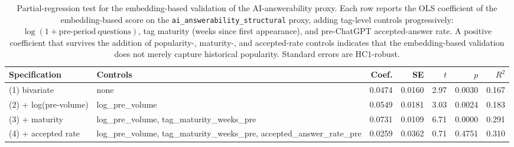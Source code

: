 \begin{table}[ht]
\centering
\caption{Partial-regression test for the embedding-based validation of the AI-answerability proxy. Each row reports the OLS coefficient of the embedding-based score on the \texttt{ai\_answerability\_structural} proxy, adding tag-level controls progressively: $\log(1+\text{pre-period}~\text{questions})$, tag maturity (weeks since first appearance), and pre-ChatGPT accepted-answer rate. A positive coefficient that survives the addition of popularity-, maturity-, and accepted-rate controls indicates that the embedding-based validation does not merely capture historical popularity. Standard errors are $\text{HC1}$-robust.}
\label{tab:embedding_partial_regression}
\small
\begin{tabular}{llrrrrr}
\toprule
Specification & Controls & Coef. & SE & $t$ & $p$ & $R^2$ \\
\midrule
(1) bivariate & none & 0.0474 & 0.0160 & 2.97 & 0.0030 & 0.167 \\
(2) + log(pre-volume) & log_pre_volume & 0.0549 & 0.0181 & 3.03 & 0.0024 & 0.183 \\
(3) + maturity & log_pre_volume, tag_maturity_weeks_pre & 0.0731 & 0.0109 & 6.71 & 0.0000 & 0.291 \\
(4) + accepted rate & log_pre_volume, tag_maturity_weeks_pre, accepted_answer_rate_pre & 0.0259 & 0.0362 & 0.71 & 0.4751 & 0.310 \\
\bottomrule
\end{tabular}
\end{table}